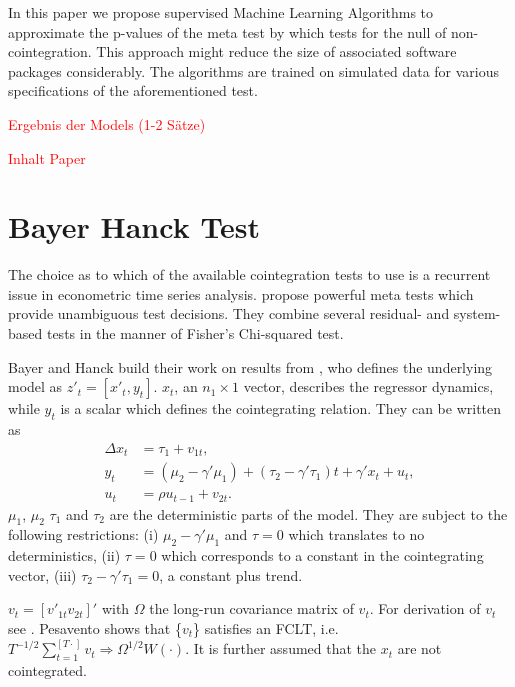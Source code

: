 \documentclass[12pt,a4paper]{article}
\begin{document}
In this paper we propose supervised Machine Learning Algorithms to
approximate the p-values of the meta test by \textcite{Bayerhanck_2012}
which tests for the null of non-cointegration. This approach might
reduce the size of associated software packages considerably. The
algorithms are trained on simulated data for various specifications of
the aforementioned test.

\textcolor{red}{Ergebnis der Models (1-2 Sätze)}

\textcolor{red}{Inhalt Paper}

\hypertarget{bayer-hanck-test}{%
\section{Bayer Hanck Test}\label{bayer-hanck-test}}

The choice as to which of the available cointegration tests to use is a
recurrent issue in econometric time series analysis.
\textcite{Bayerhanck_2012} propose powerful meta tests which provide
unambiguous test decisions. They combine several residual- and
system-based tests in the manner of Fisher's \autocite*{Fisher_1932}
Chi-squared test.

Bayer and Hanck build their work on results from
\textcite{Pesavento_2004}, who defines the underlying model as
\(z'_t = [x'_t, y_t]\). \(x_t\), an \(n_1 \times 1\) vector, describes
the regressor dynamics, while \(y_t\) is a scalar which defines the
cointegrating relation. They can be written as \begin{align}
\Delta x_t &= \tau_1 + v_{1t}, \\
y_t &= (\mu_2 - \gamma' \mu_1) + (\tau_2 - \gamma' \tau_1) t + \gamma' x_t + u_t, \\
u_t &= \rho u_{t-1} + v_{2t}.
\end{align} \(\mu_1\), \(\mu_2\) \(\tau_1\) and \(\tau_2\) are the
deterministic parts of the model. They are subject to the following
restrictions: (i) \(\mu_2 - \gamma' \mu_1\) and \(\tau = 0\) which
translates to no deterministics, (ii) \(\tau = 0\) which corresponds to
a constant in the cointegrating vector, (iii)
\(\tau_2 - \gamma' \tau_1 = 0\), a constant plus trend.

\(v_t = [v'_{1t} v_{2t}]'\) with \(\Omega\) the long-run covariance
matrix of \(v_t\). For derivation of \(v_t\) see
\textcite{Pesavento_2004}. Pesavento shows that \{\(v_t\)\} satisfies an
FCLT,
i.e.~\(T^{-1/2} \sum^{[T \cdot]}_{t=1} v_t \Rightarrow \Omega^{1/2} W(\cdot)\).
It is further assumed that the \(x_t\) are not cointegrated.
\end{document}
